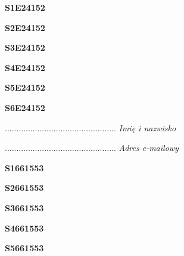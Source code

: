 \begin{turn}{90}\huge \textbf{S1E24152}\end{turn}

\begin{turn}{90}\huge \textbf{S2E24152}\end{turn}

\begin{turn}{90}\huge \textbf{S3E24152}\end{turn}

\begin{turn}{90}\huge \textbf{S4E24152}\end{turn}

\begin{turn}{90}\huge \textbf{S5E24152}\end{turn}

\begin{turn}{90}\huge \textbf{S6E24152}\end{turn}

\begin{turn}{90}\begin{minipage}{\linewidth} \vspace{20mm} ................................................  \textit{Imię i nazwisko}\end{minipage}\end{turn}

\begin{turn}{90}\begin{minipage}{\linewidth} \vspace{20mm} ................................................  \textit{Adres e-mailowy}\end{minipage}\end{turn}

\begin{turn}{90}\huge \textbf{S1661553}\end{turn}

\begin{turn}{90}\huge \textbf{S2661553}\end{turn}

\begin{turn}{90}\huge \textbf{S3661553}\end{turn}

\begin{turn}{90}\huge \textbf{S4661553}\end{turn}

\begin{turn}{90}\huge \textbf{S5661553}\end{turn}

